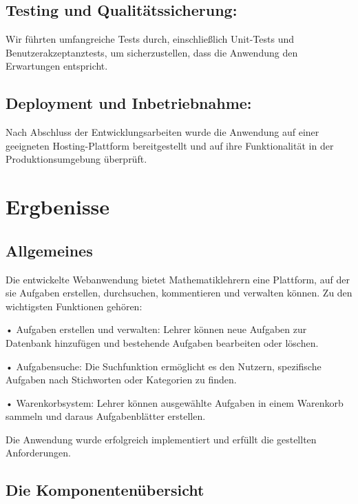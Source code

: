 \documentclass[12pt,a4paper]{article} %
\begin{document}
\subsection{Testing und Qualitätssicherung: }
Wir führten umfangreiche Tests durch, einschließlich Unit-Tests und Benutzerakzeptanztests, um sicherzustellen, dass die Anwendung den Erwartungen entspricht.


\subsection{Deployment und Inbetriebnahme: }
Nach Abschluss der Entwicklungsarbeiten wurde die Anwendung auf einer geeigneten Hosting-Plattform bereitgestellt und auf ihre Funktionalität in der Produktionsumgebung überprüft.


\section{Ergbenisse}
\subsection{Allgemeines}

Die entwickelte Webanwendung bietet Mathematiklehrern eine Plattform, auf der sie Aufgaben erstellen, durchsuchen, kommentieren und verwalten können. Zu den wichtigsten Funktionen gehören:

•	Aufgaben erstellen und verwalten: Lehrer können neue Aufgaben zur Datenbank hinzufügen und bestehende Aufgaben bearbeiten oder löschen.

•	Aufgabensuche: Die Suchfunktion ermöglicht es den Nutzern, spezifische Aufgaben nach Stichworten oder Kategorien zu finden.

•	Warenkorbsystem: Lehrer können ausgewählte Aufgaben in einem Warenkorb sammeln und daraus Aufgabenblätter erstellen.

Die Anwendung wurde erfolgreich implementiert und erfüllt die gestellten Anforderungen.

\subsection{Die Komponentenübersicht}
\end{document}
